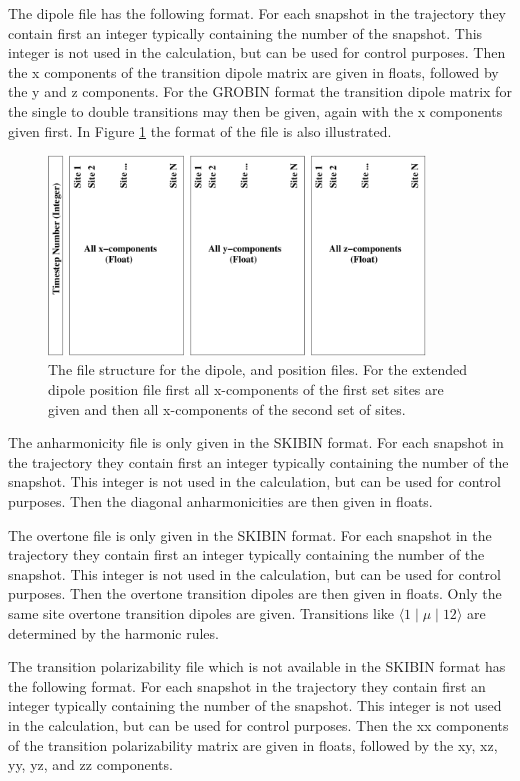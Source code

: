 The dipole file has the following format.
For each snapshot in the trajectory they contain first an integer typically containing the number of the snapshot. This integer is not used in the calculation, but can be used for control purposes.
Then the x components of the transition dipole matrix are given in floats, followed by the y and z components. For the GROBIN format the transition dipole matrix for the single to double transitions may then be given, again with the x components given first. In Figure \ref{fig:filestructure} the format of the file is also illustrated.
\begin{figure}[h!]
\begin{center}
\includegraphics[width=10cm]{file_structure.pdf}
\end{center}
\caption{\label{fig:filestructure}The file structure for the dipole, and position files. For the extended dipole position file first all x-components of the first set sites are given and then all x-components of the second set of sites.}
\end{figure}

The anharmonicity file is only given in the SKIBIN format.
For each snapshot in the trajectory they contain first an integer typically containing the number of the snapshot. This integer is not used in the calculation, but can be used for control purposes.
Then the diagonal anharmonicities are then given in floats.

The overtone file is only given in the SKIBIN format.
For each snapshot in the trajectory they contain first an integer typically containing the number of the snapshot. This integer is not used in the calculation, but can be used for control purposes.
Then the overtone transition dipoles are then given in floats. Only the same site overtone transition dipoles are given. Transitions like $\langle 1\mid\mu\mid 12\rangle$ are determined by the harmonic rules.

The transition polarizability file which is not available in the SKIBIN format 
has the following format. For each snapshot in the trajectory they contain first an integer 
typically containing the number of the snapshot. This integer is not used in the calculation, 
but can be used for control purposes. Then the xx components of the transition polarizability
matrix are given in floats, followed by the xy, xz, yy, yz, and zz components. 

